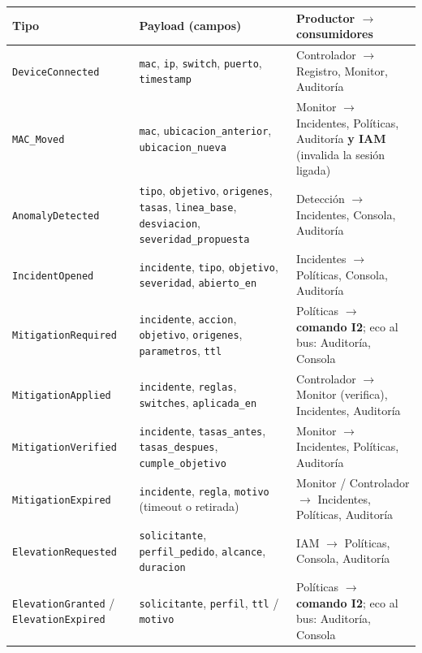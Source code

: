 \documentclass[11pt,a4paper]{report}
\begin{document}
\begin{table}[h!]
\centering
\small
\begin{tabularx}{\linewidth}{p{3.2cm}p{4.6cm}X}
\toprule
\textbf{Tipo} & \textbf{Payload (campos)} & \textbf{Productor $\rightarrow$ consumidores} \\
\midrule
\texttt{DeviceConnected} & \texttt{mac}, \texttt{ip}, \texttt{switch}, \texttt{puerto}, \texttt{timestamp} & Controlador $\rightarrow$ Registro, Monitor, Auditoría \\
\texttt{MAC\_Moved} & \texttt{mac}, \texttt{ubicacion\_anterior}, \texttt{ubicacion\_nueva} & Monitor $\rightarrow$ Incidentes, Políticas, Auditoría \textbf{y IAM} (invalida la sesión ligada) \\
\texttt{AnomalyDetected} & \texttt{tipo}, \texttt{objetivo}, \texttt{origenes}, \texttt{tasas}, \texttt{linea\_base}, \texttt{desviacion}, \texttt{severidad\_propuesta} & Detección $\rightarrow$ Incidentes, Consola, Auditoría \\
\texttt{IncidentOpened} & \texttt{incidente}, \texttt{tipo}, \texttt{objetivo}, \texttt{severidad}, \texttt{abierto\_en} & Incidentes $\rightarrow$ Políticas, Consola, Auditoría \\
\texttt{MitigationRequired} & \texttt{incidente}, \texttt{accion}, \texttt{objetivo}, \texttt{origenes}, \texttt{parametros}, \texttt{ttl} & Políticas $\rightarrow$ \textbf{comando I2}; eco al bus: Auditoría, Consola \\
\texttt{MitigationApplied} & \texttt{incidente}, \texttt{reglas}, \texttt{switches}, \texttt{aplicada\_en} & Controlador $\rightarrow$ Monitor (verifica), Incidentes, Auditoría \\
\texttt{MitigationVerified} & \texttt{incidente}, \texttt{tasas\_antes}, \texttt{tasas\_despues}, \texttt{cumple\_objetivo} & Monitor $\rightarrow$ Incidentes, Políticas, Auditoría \\
\texttt{MitigationExpired} & \texttt{incidente}, \texttt{regla}, \texttt{motivo} (timeout o retirada) & Monitor / Controlador $\rightarrow$ Incidentes, Políticas, Auditoría \\
\texttt{ElevationRequested} & \texttt{solicitante}, \texttt{perfil\_pedido}, \texttt{alcance}, \texttt{duracion} & IAM $\rightarrow$ Políticas, Consola, Auditoría \\
\texttt{ElevationGranted} / \texttt{ElevationExpired} & \texttt{solicitante}, \texttt{perfil}, \texttt{ttl} / \texttt{motivo} & Políticas $\rightarrow$ \textbf{comando I2}; eco al bus: Auditoría, Consola \\

\end{tabularx}
\end{table}
\end{document}
